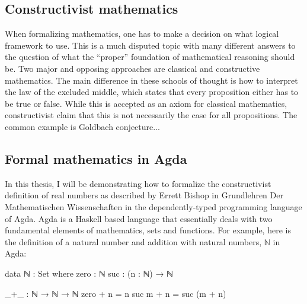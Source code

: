 \documentclass[11pt,a4paper]{article}
\begin{document}
\subsection{Constructivist mathematics}
When formalizing mathematics, one has to make a decision on what logical framework to use. This is a much disputed topic with many different answers to the question of what the ``proper'' foundation of mathematical reasoning should be. Two major and opposing approaches are classical and constructive mathematics. The main difference in these schools of thought is how to interpret the law of the excluded middle, which states that every proposition either has to be true or false. While this is accepted as an axiom for classical mathematics, constructivist claim that this is not necessarily the case for all propositions. The common example is Goldbach conjecture...

\subsection{Formal mathematics in Agda}\label{subsec: Agda}
In this thesis, I will be demonstrating how to formalize the constructivist definition of real numbers as described by Errett Bishop in Grundlehren Der Mathematischen Wissenschaften \cite{bishop:67} in the dependently-typed programming language of Agda. Agda is a Haskell based language that essentially deals with two fundamental elements of mathematics, sets and functions. For example, here is the definition of a natural number and addition with natural numbers, $\mathbb{N}$ in Agda:\\

\begin{code}
data ℕ : Set where
  zero : ℕ
  suc  : (n : ℕ) → ℕ

_+_ : ℕ → ℕ → ℕ
zero  + n = n
suc m + n = suc (m + n)
\end{code}
\end{document}
